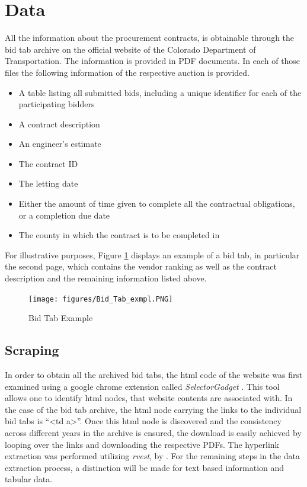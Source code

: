\documentclass[a4paper,12pt, headsepline]{scrartcl}
\numberwithin{equation}{section}
\begin{document}
\section{Data}\label{sec:data}

All the information about the procurement contracts, is obtainable through the bid tab archive on the official website of the Colorado Department of Transportation. The information is provided in PDF documents. In each of those files the following information of the respective auction is provided.

\begin{itemize}
	\item A table listing all submitted bids, including a unique identifier for each of the participating bidders
	\item A contract description
	\item An engineer's estimate
	\item The contract ID
	\item The letting date
	\item Either the amount of time given to complete all the contractual obligations, or a completion due date
	\item The county in which the contract is to be completed in 
\end{itemize}

For illustrative purposes, Figure \ref{fig:bidtab} displays an example of a bid tab, in particular the second page, which contains the vendor ranking as well as the contract description and the remaining information listed above.

\begin{figure}[H]
	\texttt{[image: figures/Bid\_Tab\_exmpl.PNG]}
	\caption{Bid Tab Example}\label{fig:bidtab}
\end{figure}

\subsection{Scraping}\label{subsec:scrap}
In order to obtain all the archived bid tabs, the html code of the website was first examined using a google chrome extension called \textit{SelectorGadget} \citep{selector}. This tool allows one to identify html nodes, that website contents are associated with. In the case of the bid tab archive, the html node carrying the links to the individual bid tabs is \enquote{<td a>}. Once this html node is discovered and the consistency across different years in the archive is ensured, the download is easily achieved by looping over the links and downloading the  respective PDFs. The hyperlink extraction was performed utilizing \textit{rvest}, by \citet{rvest}. For the remaining steps in the data extraction process, a distinction will be made for text based information and tabular data.
\end{document}
